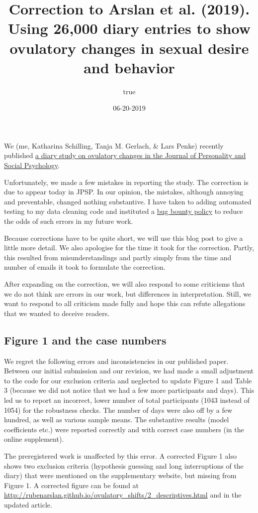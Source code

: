 \documentclass[]{article}
\title{Correction to Arslan et al. (2019). Using 26,000 diary entries to show
ovulatory changes in sexual desire and behavior}
\author{true}
\date{06-20-2019}
\begin{document}
\maketitle

We (me, Katharina Schilling, Tanja M. Gerlach, \& Lars Penke) recently
published \href{https://psycnet.apa.org/record/2018-41799-001}{a diary
study on ovulatory changes in the Journal of Personality and Social
Psychology}.

Unfortunately, we made a few mistakes in reporting the study. The
correction is due to appear today in JPSP. In our opinion, the mistakes,
although annoying and preventable, changed nothing substantive. I have
taken to adding automated testing to my data cleaning code and
instituted a \href{../bug_bounty.html}{bug bounty policy} to reduce the
odds of such errors in my future work.

Because corrections have to be quite short, we will use this blog post
to give a little more detail. We also apologise for the time it took for
the correction. Partly, this resulted from misunderstandings and partly
simply from the time and number of emails it took to formulate the
correction.

After expanding on the correction, we will also respond to some
criticisms that we do not think are errors in our work, but differences
in interpretation. Still, we want to respond to all criticism made fully
and hope this can refute allegations that we wanted to deceive readers.

\hypertarget{figure-1-and-the-case-numbers}{%
\subsection{Figure 1 and the case
numbers}\label{figure-1-and-the-case-numbers}}

We regret the following errors and inconsistencies in our published
paper. Between our initial submission and our revision, we had made a
small adjustment to the code for our exclusion criteria and neglected to
update Figure 1 and Table 3 (because we did not notice that we had a few
more participants and days). This led us to report an incorrect, lower
number of total participants (1043 instead of 1054) for the robustness
checks. The number of days were also off by a few hundred, as well as
various sample means. The substantive results (model coefficients etc.)
were reported correctly and with correct case numbers (in the online
supplement).

The preregistered work is unaffected by this error. A corrected Figure 1
also shows two exclusion criteria (hypothesis guessing and long
interruptions of the diary) that were mentioned on the supplementary
website, but missing from Figure 1. A corrected figure can be found at
\url{http://rubenarslan.github.io/ovulatory_shifts/2_descriptives.html}
and in the updated article.
\end{document}
